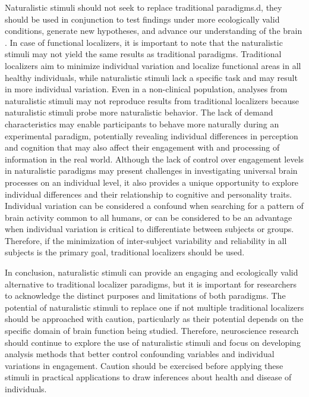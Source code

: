 %
Naturalistic stimuli should not seek to replace traditional paradigms.d, they
should be used in conjunction to test findings under more ecologically valid
conditions, generate new hypotheses, and advance our understanding of the brain
\citep[cf.][]{jaaskelainen2021movies, sonkusare2019naturalistic}.
%
In case of functional localizers, it is important to note that the naturalistic
stimuli may not yield the same results as traditional paradigms.
%
Traditional localizers aim to minimize individual variation and localize
functional areas in all healthy individuals, while naturalistic stimuli lack a
specific task and may result in more individual variation.
%
Even in a non-clinical population, analyses from naturalistic stimuli may not
reproduce results from traditional localizers because naturalistic stimuli probe
more naturalistic behavior.
%
The lack of demand characteristics may enable participants to behave more
naturally during an experimental paradigm, potentially revealing individual
differences in perception and cognition that may also affect their engagement
with and processing of information in the real world.
%
Although the lack of control over engagement levels in naturalistic paradigms
may present challenges in investigating universal brain processes on an
individual level, it also provides a unique opportunity to explore individual
differences and their relationship to cognitive and personality traits.
%
Individual variation can be considered a confound when searching for a pattern
of brain activity common to all humans, or can be considered to be an advantage
when individual variation is critical to differentiate between subjects or
groups.
%
Therefore, if the minimization of inter-subject variability and reliability in
all subjects is the primary goal, traditional localizers should be used.

%
In conclusion, naturalistic stimuli can provide an engaging and ecologically
valid alternative to traditional localizer paradigms, but it is important for
researchers to acknowledge the distinct purposes and limitations of both
paradigms.
%
The potential of naturalistic stimuli to replace one if not multiple traditional
localizers should be approached with caution, particularly as their potential
depends on the specific domain of brain function being studied.
%
Therefore, neuroscience research should continue to explore the use of
naturalistic stimuli and focus on developing analysis methods that better
control confounding variables and individual variations in engagement.
%
Caution should be exercised before applying these stimuli in practical
applications to draw inferences about health and disease of individuals.


